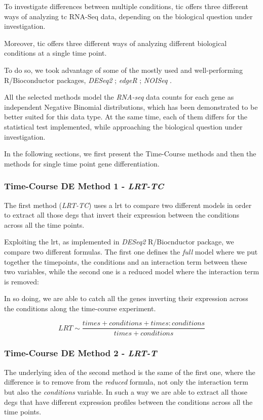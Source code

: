To investigate differences between multiple conditions, \gls{tic} offers three different ways of analyzing \gls{tc} RNA-Seq data, depending on the biological question under investigation.

Moreover, \gls{tic} offers three different ways of analyzing different biological conditions at a single time point.

To do so, we took advantage of some of the mostly used and well-performing \cite{Costa-Silva2017} R/Bioconductor packages, \textit{DESeq2} \cite{Love2014}; \textit{edgeR} \cite{Robinson2009}; \textit{NOISeq} \cite{Tarazona2012}.

All the selected methods model the \textit{RNA-seq} data counts for each gene as independent Negative Binomial distributions, which has been demonstrated \cite{Robinson2007} to be better suited for this data type.
At the same time, each of them differs for the statistical test implemented, while approaching the biological question under investigation.

In the following sections, we first present the Time-Course methods and then the methods for single time point gene differentiation.

\subsubsection{Time-Course DE Method 1 - \textit{LRT-TC}}
The first method (\textit{LRT-TC}) uses a \gls{lrt} to compare two different models in order to extract all those \glspl{deg} that invert their expression between the conditions across all the time points.

Exploiting the \gls{lrt}, as implemented in \textit{DESeq2} R/Biocnductor package, we compare two different formulas.
The first one defines the \textit{full} model where we put together the timepoints, the conditions and an interaction term between these two variables, while the second one is a reduced model where the interaction term is removed:

In so doing, we are able to catch all the genes inverting their expression across the conditions along the time-course experiment. 

\[LRT \sim \frac{times+conditions+times:conditions}{times+conditions}\]


\subsubsection{Time-Course DE Method 2 - \textit{LRT-T}}
The underlying idea of the second method is the same of the first one, where the difference is to remove from the \textit{reduced} formula, not only the interaction term but also the \textit{conditions} variable.
In such a way we are able to extract all those \glspl{deg} that have different expression profiles between the conditions across all the time points.


